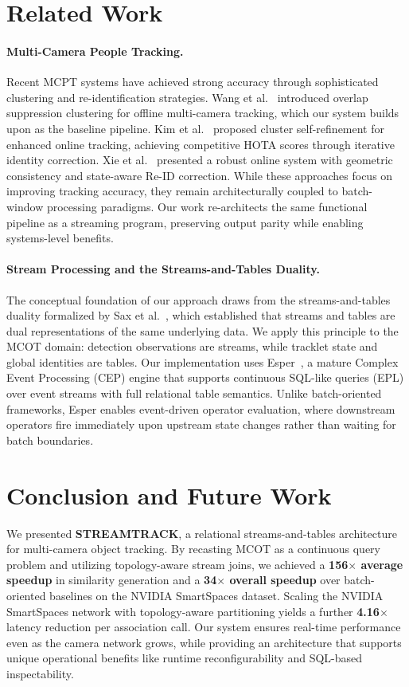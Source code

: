 \documentclass[11pt]{article}
\begin{document}
\section{Related Work}\label{sec:related}

\paragraph{Multi-Camera People Tracking.}
Recent MCPT systems have achieved strong accuracy through sophisticated clustering and re-identification strategies. Wang et al.~\cite{wang2024overlap} introduced overlap suppression clustering for offline multi-camera tracking, which our system builds upon as the baseline pipeline. Kim et al.~\cite{kim2024cluster} proposed cluster self-refinement for enhanced online tracking, achieving competitive HOTA scores through iterative identity correction. Xie et al.~\cite{xie2024robust} presented a robust online system with geometric consistency and state-aware Re-ID correction. While these approaches focus on improving tracking accuracy, they remain architecturally coupled to batch-window processing paradigms. Our work re-architects the same functional pipeline as a streaming program, preserving output parity while enabling systems-level benefits.

\paragraph{Stream Processing and the Streams-and-Tables Duality.}
The conceptual foundation of our approach draws from the streams-and-tables duality formalized by Sax et al.~\cite{sax2018streams}, which established that streams and tables are dual representations of the same underlying data. We apply this principle to the MCOT domain: detection observations are streams, while tracklet state and global identities are tables. Our implementation uses Esper~\cite{espertech2024}, a mature Complex Event Processing (CEP) engine that supports continuous SQL-like queries (EPL) over event streams with full relational table semantics. Unlike batch-oriented frameworks, Esper enables event-driven operator evaluation, where downstream operators fire immediately upon upstream state changes rather than waiting for batch boundaries.

\section{Conclusion and Future Work}\label{sec:conclusion}
We presented \textbf{STREAMTRACK}, a relational streams-and-tables architecture for multi-camera object tracking. By recasting MCOT as a continuous query problem and utilizing topology-aware stream joins, we achieved a \textbf{156$\times$ average speedup} in similarity generation and a \textbf{34$\times$ overall speedup} over batch-oriented baselines on the NVIDIA SmartSpaces dataset. Scaling the NVIDIA SmartSpaces network with topology-aware partitioning yields a further \textbf{4.16$\times$} latency reduction per association call. Our system ensures real-time performance even as the camera network grows, while providing an architecture that supports unique operational benefits like runtime reconfigurability and SQL-based inspectability.
\end{document}
